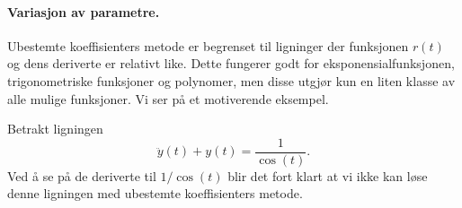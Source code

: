 \documentclass{article}
\theoremstyle{definition}
\theoremstyle{remark}
\newenvironment{ex}
{\pushQED{\qed}\renewcommand{\qedsymbol}{$\triangle$}\exx}
{\popQED\endexx}
\begin{document}
\begin{multicols*}{2}
\paragraph*{Variasjon av parametre.} Ubestemte koeffisienters metode er begrenset til ligninger der funksjonen $r(t)$ og dens deriverte er relativt like. Dette fungerer godt for eksponensialfunksjonen, trigonometriske funksjoner og polynomer, men disse utgjør kun en liten klasse av alle mulige funksjoner. Vi ser på et motiverende eksempel.

\begin{ex} \label{ex:motiverende_eks}
  Betrakt ligningen
  \begin{equation*}
    \ddot{y}(t) + y(t) = \frac{1}{\cos(t)}.
  \end{equation*}
  Ved å se på de deriverte til $1 / \cos(t)$ blir det fort klart at vi ikke kan løse denne ligningen med ubestemte koeffisienters metode.
\end{ex}


\end{multicols*}
\end{document}
